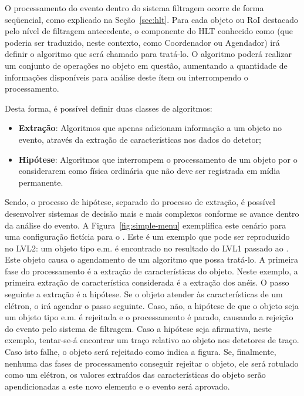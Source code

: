 O processamento do evento dentro do sistema filtragem ocorre de forma
seqüencial, como explicado na Seção~\ref{sec:hlt}. Para cada objeto ou RoI
destacado pelo nível de filtragem antecedente, o componente do HLT conhecido
como  (que poderia ser traduzido, neste contexto, como
Coordenador ou Agendador) irá definir o algoritmo que será chamado para
tratá-lo. O algoritmo poderá realizar um conjunto de operações no objeto em
questão, aumentando a quantidade de informações disponíveis para análise deste
ítem ou interrompendo o processamento.

Desta forma, é possível definir duas classes de algoritmos:

\begin{itemize}
\item \textbf{Extração}: Algoritmos que apenas adicionam informação a um
objeto no evento, através da extração de características nos dados do detetor;
\item \textbf{Hipótese}: Algoritmos que interrompem o processamento de um
objeto por o considerarem como física ordinária que não deve ser registrada em
mídia permanente.
\end{itemize}

Sendo, o processo de hipótese, separado do processo de extração, é possível
desenvolver sistemas de decisão mais e mais complexos conforme se avance
dentro da análise do evento. A Figura~\ref{fig:simple-menu} exemplifica este
cenário para uma configuração fictícia para o . Este é um
exemplo que pode ser reproduzido no LVL2: um objeto tipo e.m. é encontrado no
resultado do LVL1 passado ao . Este objeto causa o agendamento
de um algoritmo que possa tratá-lo. A primeira fase do processamento é a
extração de características do objeto. Neste exemplo, a primeira extração de
característica considerada é a extração dos anéis. O passo seguinte a extração
é a hipótese. Se o objeto atender às características de um elétron, o
 irá agendar o passo seguinte. Caso, não, a hipótese de que o
objeto seja um objeto tipo e.m. é rejeitada e o processamento é parado,
causando a rejeição do evento pelo sistema de filtragem. Caso a hipótese seja
afirmativa, neste exemplo, tentar-se-á encontrar um traço relativo ao objeto
nos detetores de traço. Caso isto falhe, o objeto será rejeitado como indica a
figura. Se, finalmente, nenhuma das fases de processamento conseguir rejeitar
o objeto, ele será rotulado como um elétron, os valores extraídos das
características do objeto serão apendicionadas a este novo elemento e o evento
será aprovado.


